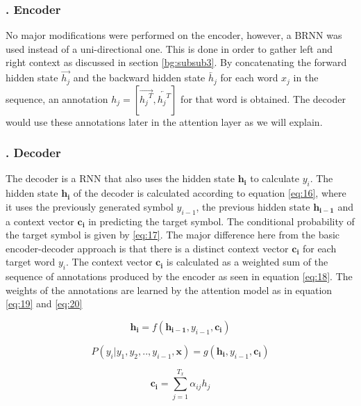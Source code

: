\subsubsection{. Encoder} 
\label{bg:subsub9}
No major modifications were performed on the encoder, however, a \ac{BRNN} was used instead of a uni-directional one. This is done in order to gather left and right context as discussed in section \ref{bg:subsub3}. By concatenating the forward hidden state $ {\overrightarrow{{h_j}}}$ and the backward hidden state $ {\overleftarrow{{h_j}}}$ for each word $x_j$ in the sequence, an annotation ${h_j}=[{\overrightarrow{{{h_j}^T}}}, {\overleftarrow{{{h_j}^T}}}] $ for that word is obtained. The decoder would use these annotations later in the attention layer as we will explain.

\subsubsection{. Decoder} 
\label{bg:subsub10}

The decoder is a \ac{RNN} that also uses the hidden state $ \mathbf{h_i}$ to calculate $ y_i$. The hidden state $ \mathbf{h_i}$ of the decoder is calculated according to equation \ref{eq:16}, where it uses the previously generated symbol $y_{i-1}$, the previous hidden state $\mathbf{h_{i-1}}$ and a context vector $\mathbf{c_i}$ in predicting the target symbol. The conditional probability of the target symbol is given by \ref{eq:17}. The major difference here from the basic encoder-decoder approach is that there is a distinct context vector $\mathbf{c_i}$ for each target word $ y_i$. The context vector $\mathbf{c_i}$ is calculated as a weighted sum of the sequence of annotations produced by the encoder as seen in equation \ref{eq:18}. The weights of the annotations are learned by the attention model as in equation \ref{eq:19} and \ref{eq:20}


\begin{equation}
\label{eq:16}
\mathbf{h_i} = f(\mathbf{h_{i-1}}, y_{i-1}, \mathbf{c_i})
\end{equation}

\begin{equation}
\label{eq:17}
P(y_i | y_1, y_2,.., y_{i-1}, \mathbf{x}) = g(\mathbf{h_{i}}, y_{i-1}, \mathbf{c_i})
\end{equation}

\begin{equation}
\label{eq:18}
\mathbf{c_i} = \sum_{j=1}^{T_x} \alpha_{ij} h_j
\end{equation}


